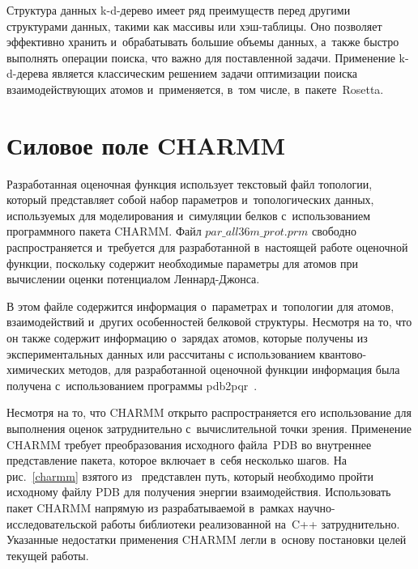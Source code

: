 Структура данных k-d-дерево имеет ряд преимуществ перед другими структурами данных, такими как массивы или хэш-таблицы. Оно позволяет эффективно хранить и~обрабатывать большие объемы данных, а~также быстро выполнять операции поиска, что важно для поставленной задачи. Применение k-d-дерева является классическим решением задачи оптимизации поиска взаимодействующих атомов и~применяется, в~том числе, в~пакете~Rosetta.

\section{Силовое поле CHARMM}

Разработанная оценочная функция использует текстовый файл топологии, который представляет собой набор параметров и~топологических данных, используемых для моделирования и~симуляции белков с~использованием программного пакета CHARMM. Файл $par\_all36m\_prot.prm$ свободно распространяется и~требуется для разработанной в~настоящей работе оценочной функции, поскольку содержит необходимые параметры для атомов при вычислении оценки потенциалом Леннард-Джонса.

В этом файле содержится информация о~параметрах и~топологии для атомов, взаимодействий и~других особенностей белковой структуры. Несмотря на то, что он также содержит информацию о~зарядах атомов, которые получены из экспериментальных данных или рассчитаны с использованием квантово-химических методов, для разработанной оценочной функции информация была получена с~использованием программы pdb2pqr~\cite{pdb2pqr}.

Несмотря на то, что CHARMM открыто распространяется его использование для выполнения оценок затруднительно с~вычислительной точки зрения. Применение CHARMM требует преобразования исходного файла~PDB во внутреннее представление пакета, которое включает в~себя несколько шагов. На рис.~\ref{charmm} взятого из~\cite{brooks} представлен путь, который необходимо пройти исходному файлу PDB для получения энергии взаимодействия. Использовать пакет CHARMM напрямую из разрабатываемой в~рамках научно-исследовательской работы библиотеки реализованной на~C++ затруднительно. Указанные недостатки применения CHARMM легли в~основу постановки целей текущей работы.


